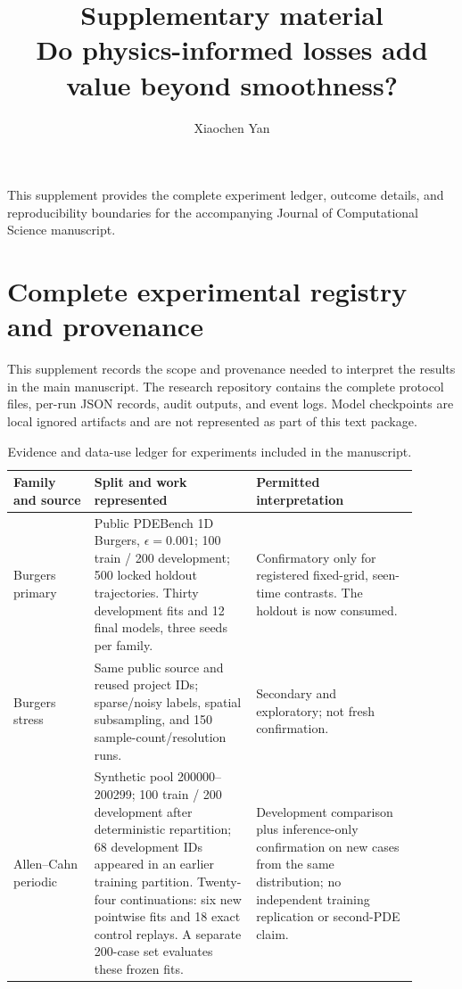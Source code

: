 \documentclass[10pt,a4paper]{article}
\begin{document}
\title{Supplementary material\\[0.35em]\large Do physics-informed losses add value beyond smoothness?}
\author{Xiaochen Yan}
\date{}
\maketitle
\noindent This supplement provides the complete experiment ledger, outcome details, and reproducibility boundaries for the accompanying Journal of Computational Science manuscript.

\section{Complete experimental registry and provenance}
This supplement records the scope and provenance needed to interpret the results in the main manuscript. The research repository contains the complete protocol files, per-run JSON records, audit outputs, and event logs. Model checkpoints are local ignored artifacts and are not represented as part of this text package.

\begin{table}[H]
\centering\footnotesize
\caption{Evidence and data-use ledger for experiments included in the manuscript.}
\label{tab:ledger}
\setlength{\tabcolsep}{3pt}
\begin{tabular}{p{0.18\linewidth}p{0.36\linewidth}p{0.36\linewidth}}
\toprule
Family and source & Split and work represented & Permitted interpretation \\
\midrule
Burgers primary & Public PDEBench 1D Burgers, $\epsilon=0.001$; 100 train / 200 development; 500 locked holdout trajectories. Thirty development fits and 12 final models, three seeds per family. & Confirmatory only for registered fixed-grid, seen-time contrasts. The holdout is now consumed. \\
Burgers stress & Same public source and reused project IDs; sparse/noisy labels, spatial subsampling, and 150 sample-count/resolution runs. & Secondary and exploratory; not fresh confirmation. \\
Allen--Cahn periodic & Synthetic pool 200000--200299; 100 train / 200 development after deterministic repartition; 68 development IDs appeared in an earlier training partition. Twenty-four continuations: six new pointwise fits and 18 exact control replays. A separate 200-case set evaluates these frozen fits. & Development comparison plus inference-only confirmation on new cases from the same distribution; no independent training replication or second-PDE claim. \\
\bottomrule
\end{tabular}
\end{table}
\end{document}
